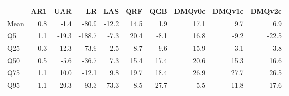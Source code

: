 \begin{tabular}{lrrrrrrrrr}
\toprule
 & AR1 & UAR & LR & LAS & QRF & QGB & DMQv0c & DMQv1c & DMQv2c \\
\midrule
Mean & 0.8 & -1.4 & -80.9 & -12.2 & 14.5 & 1.9 & 17.1 & 9.7 & 6.9 \\
Q5 & 1.1 & -19.3 & -188.7 & -7.3 & 20.4 & -8.1 & 16.8 & -9.2 & -22.5 \\
Q25 & 0.3 & -12.3 & -73.9 & 2.5 & 8.7 & 9.6 & 15.9 & 3.1 & -3.8 \\
Q50 & 0.5 & -5.6 & -36.7 & 7.3 & 15.4 & 17.4 & 20.6 & 15.3 & 16.6 \\
Q75 & 1.1 & 10.0 & -12.1 & 9.8 & 19.7 & 18.4 & 26.9 & 27.7 & 26.5 \\
Q95 & 1.1 & 20.3 & -93.3 & -73.3 & 8.5 & -27.7 & 5.5 & 11.8 & 17.6 \\
\bottomrule
\end{tabular}
